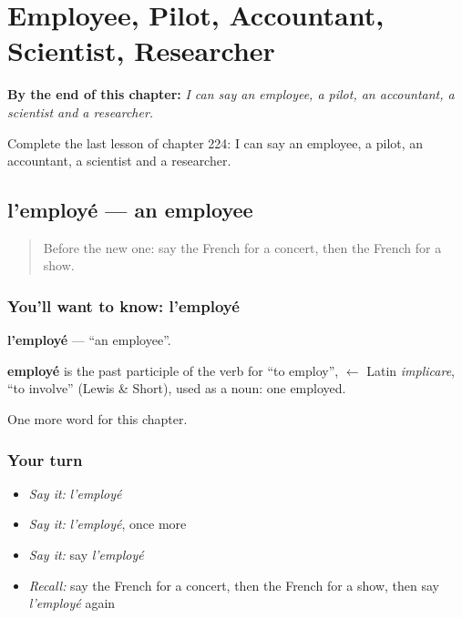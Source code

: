 
\chapter{Employee, Pilot, Accountant, Scientist, Researcher}
\label{ch:fr-employee-pilot-accountant-scientist-researcher}

\begin{chapteropening}
\textbf{By the end of this chapter:} \emph{I can say an employee, a pilot, an accountant, a scientist and a researcher.}

Complete the last lesson of chapter 224: I can say an employee, a pilot, an accountant, a scientist and a researcher.
\end{chapteropening}

\section[l'employé]{l'employé — an employee}

\label{lesson:FR-C224-employe}



\begin{quote}
Before the new one: say the French for a concert, then the French for a show.
\end{quote}

\subsection*{You'll want to know: l'employé}
\textbf{l'employé} — \textquotedblleft{}an employee\textquotedblright{}.

\begin{cousinweb}
\textbf{employé} is the past participle of the verb for \textquotedblleft{}to employ\textquotedblright{}, $\leftarrow$ Latin \emph{implicare}, \textquotedblleft{}to involve\textquotedblright{} (Lewis \& Short), used as a noun: one employed.
\end{cousinweb}

\begin{grammarlens}[title={What you've built}]
One more word for this chapter.
\end{grammarlens}

\subsection*{Your turn}
\begin{itemize}
\raggedright
  \item \emph{Say it:} \emph{l'employé}
  \item \emph{Say it:} \emph{l'employé}, once more
  \item \emph{Say it:} say \emph{l'employé}
  \item \emph{Recall:} say the French for a concert, then the French for a show, then say \emph{l'employé} again
\end{itemize}

